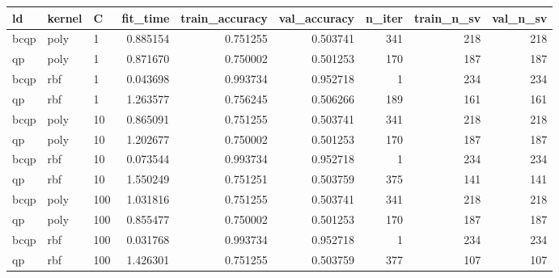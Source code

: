 \begin{tabular}{lllrrrrrr}
\toprule
  ld & kernel &   C &  fit\_time &  train\_accuracy &  val\_accuracy &  n\_iter &  train\_n\_sv &  val\_n\_sv \\
\midrule
bcqp &   poly &   1 &  0.885154 &        0.751255 &      0.503741 &     341 &         218 &       218 \\
  qp &   poly &   1 &  0.871670 &        0.750002 &      0.501253 &     170 &         187 &       187 \\
bcqp &    rbf &   1 &  0.043698 &        0.993734 &      0.952718 &       1 &         234 &       234 \\
  qp &    rbf &   1 &  1.263577 &        0.756245 &      0.506266 &     189 &         161 &       161 \\
bcqp &   poly &  10 &  0.865091 &        0.751255 &      0.503741 &     341 &         218 &       218 \\
  qp &   poly &  10 &  1.202677 &        0.750002 &      0.501253 &     170 &         187 &       187 \\
bcqp &    rbf &  10 &  0.073544 &        0.993734 &      0.952718 &       1 &         234 &       234 \\
  qp &    rbf &  10 &  1.550249 &        0.751251 &      0.503759 &     375 &         141 &       141 \\
bcqp &   poly & 100 &  1.031816 &        0.751255 &      0.503741 &     341 &         218 &       218 \\
  qp &   poly & 100 &  0.855477 &        0.750002 &      0.501253 &     170 &         187 &       187 \\
bcqp &    rbf & 100 &  0.031768 &        0.993734 &      0.952718 &       1 &         234 &       234 \\
  qp &    rbf & 100 &  1.426301 &        0.751255 &      0.503759 &     377 &         107 &       107 \\
\bottomrule
\end{tabular}
